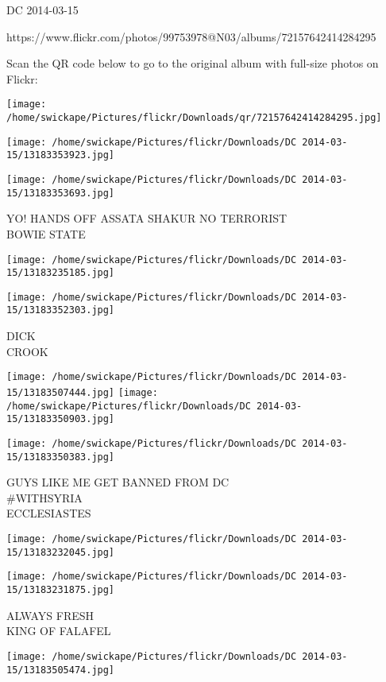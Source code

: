\documentclass[10pt,letterpaper]{article}
\begin{document}
DC 2014-03-15

https://www.flickr.com/photos/99753978@N03/albums/72157642414284295

Scan the QR code below to go to the original album with full-size photos on Flickr:

\texttt{[image: /home/swickape/Pictures/flickr/Downloads/qr/72157642414284295.jpg]}
\pagebreak

\texttt{[image: /home/swickape/Pictures/flickr/Downloads/DC 2014-03-15/13183353923.jpg]}

\vspace{0.25in}
\texttt{[image: /home/swickape/Pictures/flickr/Downloads/DC 2014-03-15/13183353693.jpg]}

YO!  HANDS OFF ASSATA SHAKUR NO TERRORIST\\
BOWIE STATE
\pagebreak

\texttt{[image: /home/swickape/Pictures/flickr/Downloads/DC 2014-03-15/13183235185.jpg]}

\vspace{0.25in}
\texttt{[image: /home/swickape/Pictures/flickr/Downloads/DC 2014-03-15/13183352303.jpg]}

DICK\\
CROOK
\pagebreak

\texttt{[image: /home/swickape/Pictures/flickr/Downloads/DC 2014-03-15/13183507444.jpg]}
\texttt{[image: /home/swickape/Pictures/flickr/Downloads/DC 2014-03-15/13183350903.jpg]}

\texttt{[image: /home/swickape/Pictures/flickr/Downloads/DC 2014-03-15/13183350383.jpg]}

GUYS LIKE ME GET BANNED FROM DC\\
\#WITHSYRIA\\
ECCLESIASTES
\pagebreak

\texttt{[image: /home/swickape/Pictures/flickr/Downloads/DC 2014-03-15/13183232045.jpg]}

\vspace{0.25in}
\texttt{[image: /home/swickape/Pictures/flickr/Downloads/DC 2014-03-15/13183231875.jpg]}

ALWAYS FRESH\\
KING OF FALAFEL
\pagebreak

\texttt{[image: /home/swickape/Pictures/flickr/Downloads/DC 2014-03-15/13183505474.jpg]}
\end{document}
